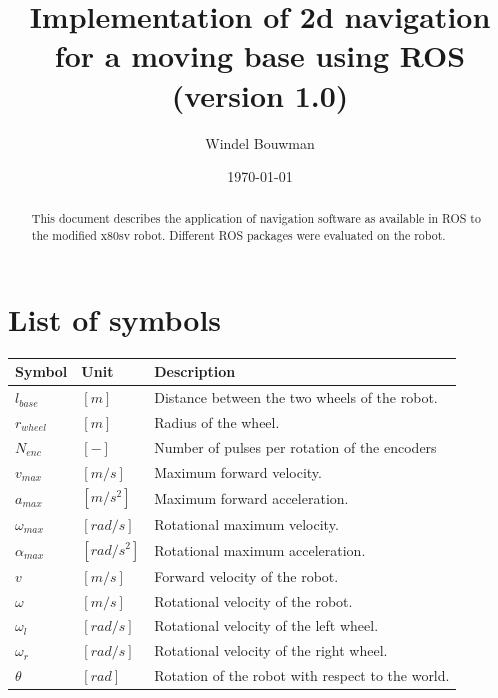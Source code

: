 \documentclass[a4paper]{article}
\begin{document}
\title{Implementation of 2d navigation for a moving base using ROS
(version 1.0)
}
\date{\today}
\author{Windel Bouwman}

\maketitle
\begin{abstract}
This document describes the application of navigation software
as available in ROS to the modified x80sv robot. Different ROS
packages were evaluated on the robot.
\end{abstract}

\tableofcontents

\section*{List of symbols}

\begin{tabular}{ | l | l | l | }
  \hline                       
  Symbol & Unit & Description \\
  \hline                       
  $l_{base}$ & $[m]$ & Distance between the two wheels of the robot. \\
  \hline                       
  $r_{wheel}$ & $[m]$ & Radius of the wheel. \\
  \hline                       
  $N_{enc}$ & $[-]$ & Number of pulses per rotation of the encoders \\
  \hline                       
  $v_{max}$ & $[m/s]$ & Maximum forward velocity. \\
  \hline                       
  $a_{max}$ & $[m/s^2]$ & Maximum forward acceleration. \\
  \hline                       
  $\omega_{max}$ & $[rad/s]$ & Rotational maximum velocity. \\
  \hline                       
  $\alpha_{max}$ & $[rad/s^2]$ & Rotational maximum acceleration. \\
  \hline                       
  $v$ & $[m/s]$ & Forward velocity of the robot. \\
  \hline                       
  $\omega$ & $[m/s]$ & Rotational velocity of the robot. \\
  \hline                       
  $\omega_l$ & $[rad/s]$ & Rotational velocity of the left wheel. \\
  \hline                       
  $\omega_r$ & $[rad/s]$ & Rotational velocity of the right wheel. \\
  \hline                       
  $\theta$ & $[rad]$ & Rotation of the robot with respect to the world. \\
  \hline                       
\end{tabular}
\end{document}
